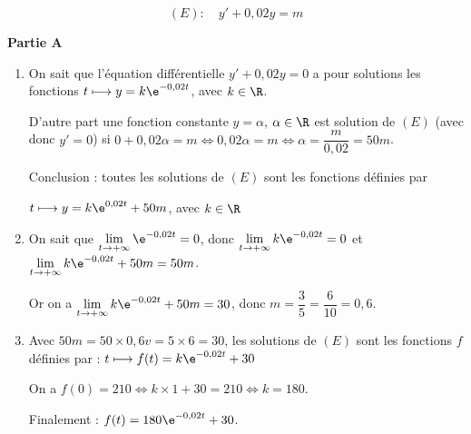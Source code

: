 
\medskip

%
%

\[(E) : \quad  y'  +0,02y = m\]

\medskip

\textbf{Partie A}

\medskip

\begin{enumerate}
\item %

On sait que l'équation différentielle $y' + 0,02y = 0$ a pour solutions les fonctions $t \longmapsto y = k\e^{-0,02t}$, avec $k \in \R$.

D'autre part une fonction constante $y = \alpha$, \:$\alpha \in \R$ est solution de $(E)$ (avec donc $y' = 0$) si $0 + 0,02\alpha = m \iff 0,02\alpha = m \iff \alpha = \dfrac{m}{0,02} = 50m$.

Conclusion : toutes les solutions de $(E)$ sont les fonctions définies par 
\begin{center} $t \longmapsto y = k\e^{0,02t} + 50m$, \: avec $k \in \R$\end{center}
\item %

On sait que $\displaystyle\lim_{t \to + \infty} \e^{-0,02t} = 0$, donc $\displaystyle\lim_{t \to + \infty} k\e^{-0,02t} = 0$ et $\displaystyle\lim_{t \to + \infty} k\e^{-0,02t} + 50m = 50m$.

Or on a $\displaystyle\lim_{t \to + \infty} k\e^{-0,02t} + 50m  = 30$, donc $m = \dfrac35 = \dfrac{6}{10} = 0,6$.
\item %
Avec $50m = 50 \times 0,6 v= 5 \times 6 = 30$, les solutions de $(E)$ sont les fonctions $f$ définies par : $ t \longmapsto f(t) = k\e^{-0,02t} + 30$

On a $f(0) = 210 \iff k \times 1 + 30 = 210 \iff k = 180$.

Finalement : $f(t) = 180\e^{-0,02t} + 30$.
\end{enumerate}

